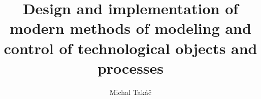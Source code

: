\documentclass[]{tukethesis}
\author{Michal Takáč}
\title{Design and implementation of modern methods of modeling and control of technological objects and processes}
\subtitle{}
\begin{document}
\renewcommand\theHfigure{\theHsection.\arabic{figure}}
\renewcommand\theHtable{\theHsection.\arabic{table}}

\firstpage

\titlepage


%
%






\end{document}
